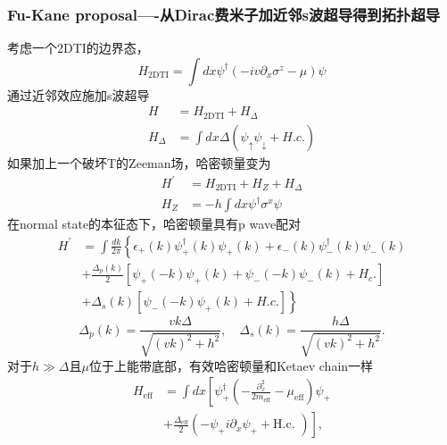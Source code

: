 \documentclass[10pt,openany]{book}
\theoremstyle{thmstyle} %
\theoremstyle{defstyle} %
\theoremstyle{prostyle} %
\begin{document}
\subsubsection{Fu-Kane proposal----从Dirac费米子加近邻s波超导得到拓扑超导}
考虑一个2DTI的边界态，
\begin{equation*}
  H_{2 \mathrm{DTI}}=\int d x \psi^{\dagger}\left(-i v \partial_x \sigma^z-\mu\right) \psi
\end{equation*}
通过近邻效应施加s波超导
\begin{equation*}
  \begin{aligned}
    H & =H_{2 \mathrm{DTI}}+H_{\Delta} \\
    H_{\Delta} & =\int d x \Delta\left(\psi_{\uparrow} \psi_{\downarrow}+H . c .\right)
    \end{aligned}
\end{equation*}
如果加上一个破坏T的Zeeman场，哈密顿量变为
\begin{equation*}
  \begin{aligned}
    H^{\prime} & =H_{2 \mathrm{DTI}}+H_Z+H_{\Delta} \\
    H_Z & =-h \int d x \psi^{\dagger} \sigma^x \psi
    \end{aligned}
\end{equation*}
在normal state的本征态下，哈密顿量具有p wave配对
\begin{equation}
  \begin{aligned}
    H^{\prime} & =\int \frac{d k}{2 \pi}\left\{\epsilon_{+}(k) \psi_{+}^{\dagger}(k) \psi_{+}(k)+\epsilon_{-}(k) \psi_{-}^{\dagger}(k) \psi_{-}(k)\right. \\
    & +\frac{\Delta_p(k)}{2}\left[\psi_{+}(-k) \psi_{+}(k)+\psi_{-}(-k) \psi_{-}(k)+H_c .\right] \\
    & \left.+\Delta_s(k)\left[\psi_{-}(-k) \psi_{+}(k)+H . c .\right]\right\}
    \end{aligned}
\end{equation}
\begin{equation*}
  \Delta_p(k)=\frac{v k \Delta}{\sqrt{(v k)^2+h^2}}, \quad \Delta_s(k)=\frac{h \Delta}{\sqrt{(v k)^2+h^2}} .
\end{equation*}
对于$ h \gg \Delta $且$ \mu $位于上能带底部，有效哈密顿量和Ketaev chain一样
\begin{equation*}
  \begin{aligned}
    H_{\mathrm{eff}} & =\int d x\left[\psi_{+}^{\dagger}\left(-\frac{\partial_x^2}{2 m_{\mathrm{eff}}}-\mu_{\mathrm{eff}}\right) \psi_{+}\right. \\
    & \left.+\frac{\Delta_{\mathrm{eff}}}{2}\left(-\psi_{+} i \partial_x \psi_{+}+\text {H.c. }\right)\right],
    \end{aligned}
\end{equation*}
\end{document}
